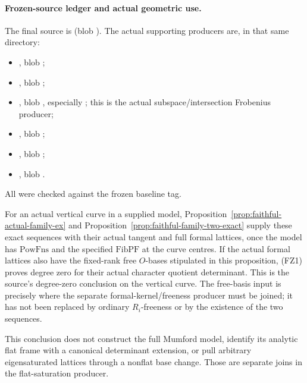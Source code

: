\paragraph{Frozen-source ledger and actual geometric use.}
The final source is
(blob ).
The actual supporting producers are, in that same directory:
\begin{itemize}
\item {},
blob ;
\item {},
blob ;
\item {},
blob ,
especially ; this is the
actual subspace/intersection Frobenius producer;
\item {},
blob ;
\item {},
blob ;
\item {},
blob .
\end{itemize}
All were checked against the frozen baseline tag.

For an actual vertical curve in a supplied model,
Proposition~\ref{prop:faithful-actual-family-ex} and
Proposition~\ref{prop:faithful-family-two-exact}
supply these exact sequences with their actual tangent
and full formal lattices, once the model has
\(\mathrm{PowFns}\) and the specified \(\mathrm{FibPF}\)
at the curve centres.
If the actual formal lattices also have the fixed-rank
free \(O\)-bases stipulated in this proposition,
(FZ1) proves degree zero for their actual character
quotient determinant.
This is the source's degree-zero conclusion on the
vertical curve.  The free-basis input is precisely
where the separate formal-kernel/freeness producer
must be joined; it has not been replaced by ordinary
\(R_i\)-freeness or by the existence of the two sequences.

This conclusion does not construct the full Mumford
model, identify its analytic flat frame with a canonical
determinant extension, or pull arbitrary eigensaturated
lattices through a nonflat base change.
Those are separate joins in the flat-saturation producer.
